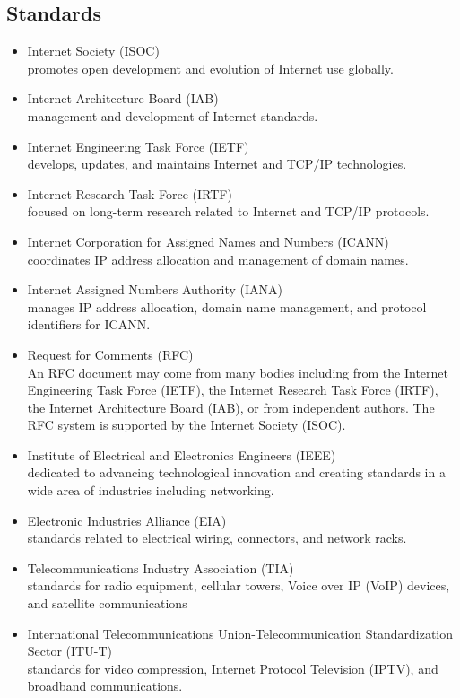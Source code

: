 \documentclass[11pt]{article}
\begin{document}
\subsection{Standards}
\begin{itemize}
    \item Internet Society (ISOC) \\
    promotes open development and evolution of Internet use globally.
    \item Internet Architecture Board (IAB) \\
    management and development of Internet standards. 
    \item Internet Engineering Task Force (IETF) \\
    develops, updates, and maintains Internet and TCP/IP technologies.
    \item Internet Research Task Force (IRTF) \\
    focused on long-term research related to Internet and TCP/IP protocols.
    \item Internet Corporation for Assigned Names and Numbers (ICANN) \\
    coordinates IP address allocation and management of domain names.
    \item Internet Assigned Numbers Authority (IANA) \\
    manages IP address allocation, domain name management, and protocol identifiers for ICANN.\@
    \item Request for Comments (RFC) \\
    An RFC document may come from many bodies including from the Internet Engineering Task Force (IETF), the Internet Research Task Force (IRTF), the Internet Architecture Board (IAB), or from independent authors. The RFC system is supported by the Internet Society (ISOC).
    \item Institute of Electrical and Electronics Engineers (IEEE) \\
    dedicated to advancing technological innovation and creating standards in a wide area of industries including networking.
    \item Electronic Industries Alliance (EIA) \\
    standards related to electrical wiring, connectors, and network racks.
    \item Telecommunications Industry Association (TIA) \\
    standards for radio equipment, cellular towers, Voice over IP (VoIP) devices, and satellite communications
    \item International Telecommunications Union-Telecommunication Standardization Sector (ITU-T) \\
    standards for video compression, Internet Protocol Television (IPTV), and broadband communications.
\end{itemize}
\end{document}
